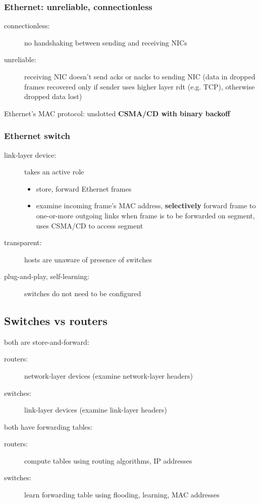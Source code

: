 \subsubsection{Ethernet: unreliable, connectionless}
\begin{description}
	\item[connectionless:] no handshaking between sending and receiving NICs
	\item[unreliable:] receiving NIC doesn't send acks or nacks to sending NIC (data in dropped frames recovered only if sender uses higher layer rdt (e.g. TCP), otherwise dropped data lost)
\end{description}
Ethernet's MAC protocol: unslotted \textbf{CSMA/CD with binary backoff}
\subsubsection{Ethernet switch}
\begin{description}
	\item[link-layer device:] takes an active role
	\begin{itemize}
		\item store, forward Ethernet frames
		\item examine incoming frame's MAC address, \textbf{selectively} forward frame to one-or-more outgoing links when frame is to be forwarded on segment, uses CSMA/CD to access segment
	\end{itemize}
	\item[transparent:] hosts are unaware of presence of switches
	\item[plug-and-play, self-learning:] switches do not need to be configured
\end{description}

\subsection{Switches vs routers}
both are store-and-forward:
\begin{description}
	\item[routers:] network-layer devices (examine network-layer headers)
	\item[switches:] link-layer devices (examine link-layer headers)
\end{description}
both have forwarding tables:
\begin{description}
	\item[routers:] compute tables using routing algorithms, IP addresses
	\item[switches:] learn forwarding table using flooding, learning, MAC addresses
\end{description}

